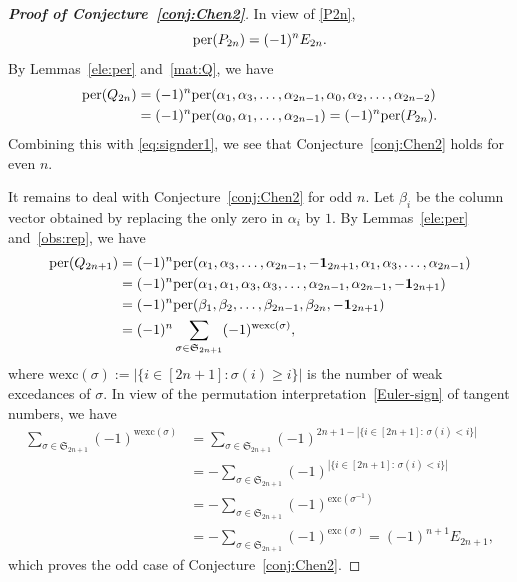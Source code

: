 \documentclass[11pt,reqno]{amsart}
\numberwithin{equation}{section}
\theoremstyle{plain}
\theoremstyle{definition}
\renewcommand{\S}{\mathfrak{S}}
\def\exc{\mathrm{exc}}
\def\wexc{\mathrm{wexc}}
\def\per{\mathrm{per}}
\def\per{{\rm per}}
\begin{document}
\begin{proof}[{\bf Proof of Conjecture~\ref{conj:Chen2}}]
In view of \eqref{P2n},
\begin{equation}\label{eq:signder1}
\per(P_{2n})=(-1)^nE_{2n}.
\end{equation}
By Lemmas~\ref{ele:per} and~\ref{mat:Q}, we have
\begin{align*}
\per(Q_{2n})&=(-1)^n\per(\alpha_{1},\alpha_{3},\ldots,\alpha_{2n-1},\alpha_0,\alpha_2,\ldots,\alpha_{2n-2})\\
&=(-1)^n\per(\alpha_{0},\alpha_{1},\ldots,\alpha_{2n-1})=(-1)^n\per(P_{2n}).
\end{align*}
Combining this with \eqref{eq:signder1}, we see that Conjecture~\ref{conj:Chen2} holds for even $n$.

It remains to deal with Conjecture~\ref{conj:Chen2} for odd $n$. Let $\beta_i$ be the column vector obtained by replacing the only zero in $\alpha_i$ by $1$. By Lemmas~\ref{ele:per} and~\ref{obs:rep}, we have
\begin{align*}
\per(Q_{2n+1})&=(-1)^{n}\per(\alpha_{1},\alpha_{3},\ldots,\alpha_{2n-1},-{\bf1}_{2n+1},\alpha_1,\alpha_3,\ldots,\alpha_{2n-1})\\
&=(-1)^{n}\per(\alpha_{1},\alpha_{1},\alpha_{3},\alpha_{3},\ldots,\alpha_{2n-1},\alpha_{2n-1},-{\bf1}_{2n+1})\\
&=(-1)^n\per(\beta_1,\beta_2,\ldots,\beta_{2n-1},\beta_{2n},-{\bf1}_{2n+1})\\
&=(-1)^n\sum_{\sigma\in\S_{2n+1}}(-1)^{\wexc(\sigma)},
\end{align*}
where $\wexc(\sigma):=|\{i\in[2n+1]: \sigma(i)\geq i\}|$ is the number of weak excedances of $\sigma$.
In view of the permutation interpretation~\eqref{Euler-sign} of tangent numbers, we have
\begin{align*}
\sum_{\sigma\in\S_{2n+1}}(-1)^{\wexc(\sigma)}&=\sum_{\sigma\in\S_{2n+1}}(-1)^{2n+1-|\{i\in[2n+1]:\, \sigma(i)< i\}|}\\
&=-\sum_{\sigma\in\S_{2n+1}}(-1)^{|\{i\in[2n+1]:\, \sigma(i)< i\}|}\\
&=-\sum_{\sigma\in\S_{2n+1}}(-1)^{\exc(\sigma^{-1})}\\
&=-\sum_{\sigma\in\S_{2n+1}}(-1)^{\exc(\sigma)}=(-1)^{n+1}E_{2n+1},
\end{align*}
which proves the odd case of Conjecture~\ref{conj:Chen2}.
\end{proof}
\end{document}
